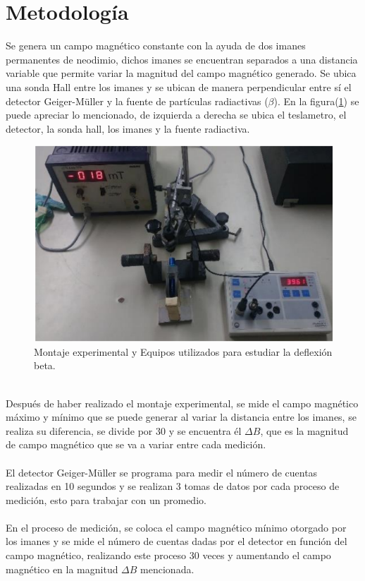 \documentclass[10pt,twocolumns,letterpaper]{article}
\begin{document}
\section{Metodología}
Se genera un campo magnético constante con la ayuda de dos imanes permanentes de neodimio, dichos imanes se encuentran separados a una distancia variable que permite variar la magnitud del campo magnético generado. Se ubica una sonda Hall entre los imanes y se ubican de manera perpendicular entre sí el detector Geiger-Müller y la fuente de partículas radiactivas ($\beta$). En la figura(\ref{fig:1}) se puede apreciar lo mencionado, de izquierda a derecha se ubica el teslametro, el detector, la sonda hall, los imanes y la fuente radiactiva.
\begin{figure}[h!]
    \centering
    \includegraphics[scale=0.5]{Montaje_Exp.png}
    \caption{Montaje experimental y Equipos utilizados para estudiar la deflexión beta.}
    \label{fig:1}
\end{figure} \\
Después de haber realizado el montaje experimental, se mide el campo magnético máximo y mínimo que se puede generar al variar la distancia entre los imanes, se realiza su diferencia, se divide por 30 y se encuentra él $\Delta B$, que es la magnitud de campo magnético que se va a variar entre cada medición.\\ \\
El detector Geiger-Müller se programa para medir el número de cuentas realizadas en 10 segundos y se realizan 3 tomas de datos por cada proceso de medición, esto para trabajar con un promedio.\\ \\
En el proceso de medición, se coloca el campo magnético mínimo otorgado por los imanes y se mide el número de cuentas dadas por el detector en función del campo magnético, realizando este proceso 30 veces y aumentando el campo magnético en la magnitud $\Delta B$ mencionada. 
\end{document}
